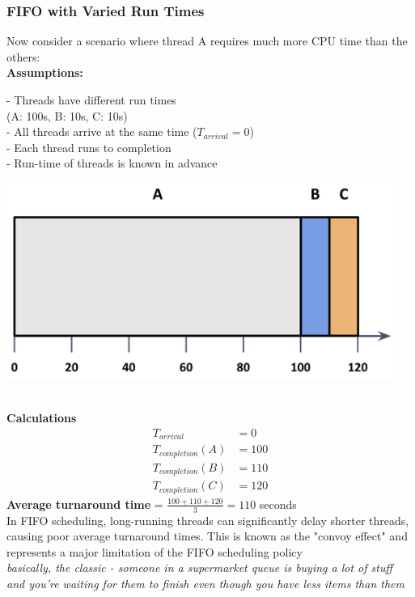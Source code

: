 \documentclass[../../compsys.tex]{subfiles}
\begin{document}
\subsubsection{FIFO with Varied Run Times}
Now consider a scenario where thread A requires much more CPU time than the others:\\[5px]
\textbf{Assumptions:}\\[5px]
\begin{minipage}[htp]{0.5\textwidth}
        - Threads have different run times \\(A: 100s, B: 10s, C: 10s) \\[5px]
        - All threads arrive at the same time ($T_{arrival} = 0$) \\[5px]
        - Each thread runs to completion \\[5px]
        - Run-time of threads is known in advance \\[5px]
\end{minipage}
\hfill
\begin{minipage}[htp]{0.5\textwidth}
    \centering
    \includegraphics[width=0.95\textwidth]{images/fifo_challenge.png}
\end{minipage}\\[8px]

\textbf{Calculations}
\begin{align*}
    T_{arrival} &= 0 \\
    T_{completion}(A) &= 100 \\
    T_{completion}(B) &= 110 \\
    T_{completion}(C) &= 120
\end{align*}
\textbf{Average turnaround time} = $\frac{100 + 110 + 120}{3} = 110$ seconds \\[3px]
In FIFO scheduling, long-running threads can significantly delay shorter threads, causing poor average turnaround times. This is known as the "convoy effect" and represents a major limitation of the FIFO scheduling policy\\[3px]
\textit{basically, the classic - someone in a supermarket queue is buying a lot of stuff and you're waiting for them to finish even though you have less items than them}
\end{document}

